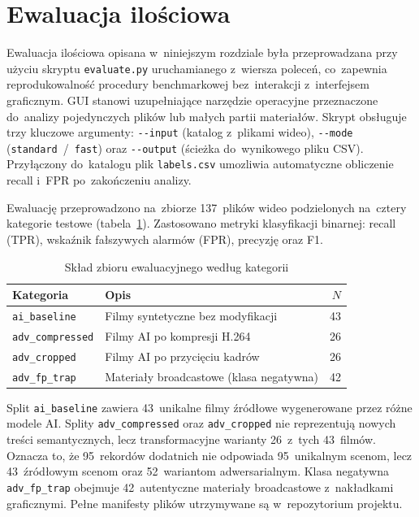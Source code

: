 \section{Ewaluacja ilościowa}
\label{sec:ewaluacja}

Ewaluacja ilościowa opisana w~niniejszym rozdziale była przeprowadzana
przy użyciu skryptu \texttt{evaluate.py} uruchamianego z~wiersza poleceń,
co~zapewnia reprodukowalność procedury benchmarkowej bez~interakcji
z~interfejsem graficznym.
GUI stanowi uzupełniające narzędzie operacyjne przeznaczone do~analizy
pojedynczych plików lub małych partii materiałów.
Skrypt obsługuje trzy kluczowe argumenty:
\texttt{{-}{-}input} (katalog z~plikami wideo),
\texttt{{-}{-}mode} (\texttt{standard}~/~\texttt{fast})
oraz \texttt{{-}{-}output} (ścieżka do~wynikowego pliku CSV).
Przyłączony do~katalogu plik \texttt{labels.csv}
umozliwia automatyczne obliczenie recall i~FPR po~zakończeniu analizy.

Ewaluację przeprowadzono na~zbiorze 137~plików wideo podzielonych
na~cztery kategorie testowe (tabela~\ref{tab:eval_splits}).
Zastosowano metryki klasyfikacji binarnej: recall (TPR),
wskaźnik fałszywych alarmów (FPR), precyzję oraz F1.

\begin{table}[h]
\centering
\caption{Skład zbioru ewaluacyjnego według kategorii}
\label{tab:eval_splits}
\begin{tabular}{llr}
\toprule
Kategoria & Opis & $N$ \\
\midrule
\texttt{ai\_baseline}    & Filmy syntetyczne bez modyfikacji              & 43 \\
\texttt{adv\_compressed} & Filmy AI po kompresji H.264                    & 26 \\
\texttt{adv\_cropped}    & Filmy AI po przycięciu kadrów                 & 26 \\
\texttt{adv\_fp\_trap}   & Materiały broadcastowe (klasa negatywna)       & 42 \\
\bottomrule
\end{tabular}
\end{table}

Split \texttt{ai\_baseline} zawiera 43~unikalne filmy źródłowe wygenerowane
przez różne modele AI. Splity \texttt{adv\_compressed} oraz
\texttt{adv\_cropped} nie reprezentują nowych treści semantycznych, lecz
transformacyjne warianty 26~z~tych 43~filmów. Oznacza to, że 95~rekordów dodatnich
nie odpowiada 95~unikalnym scenom, lecz 43~źródłowym scenom oraz 52~wariantom
adwersarialnym. Klasa negatywna \texttt{adv\_fp\_trap} obejmuje 42~autentyczne
materiały broadcastowe z~nakładkami graficznymi. Pełne manifesty plików
utrzymywane są w~repozytorium projektu.

